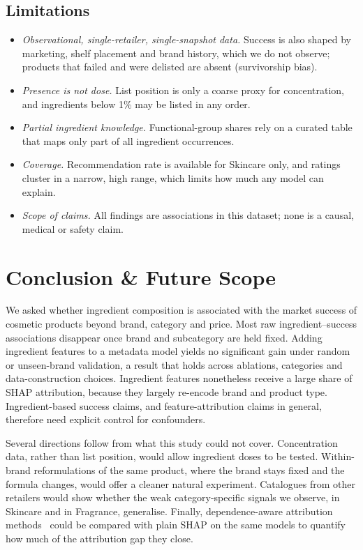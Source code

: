 \documentclass[11pt,a4paper]{article}
\newcommand{\draft}[1]{{\color{blue!70!black}#1}}
\begin{document}
\subsection{Limitations}
\draft{\begin{itemize}
\item \emph{Observational, single-retailer, single-snapshot data.} Success is also shaped by marketing, shelf placement and brand history, which we do not observe; products that failed and were delisted are absent (survivorship bias).
\item \emph{Presence is not dose.} List position is only a coarse proxy for concentration, and ingredients below 1\% may be listed in any order.
\item \emph{Partial ingredient knowledge.} Functional-group shares rely on a curated table that maps only part of all ingredient occurrences.
\item \emph{Coverage.} Recommendation rate is available for Skincare only, and ratings cluster in a narrow, high range, which limits how much any model can explain.
\item \emph{Scope of claims.} All findings are associations in this dataset; none is a causal, medical or safety claim.
\end{itemize}}

\section{Conclusion \& Future Scope}
\draft{We asked whether ingredient composition is associated with the market success of cosmetic products beyond brand, category and price. Most raw ingredient--success associations disappear once brand and subcategory are held fixed. Adding \NIngredientFeatures{} ingredient features to a metadata model yields no significant gain under random or unseen-brand validation, a result that holds across ablations, categories and data-construction choices. Ingredient features nonetheless receive a large share of SHAP attribution, because they largely re-encode brand and product type. Ingredient-based success claims, and feature-attribution claims in general, therefore need explicit control for confounders.

Several directions follow from what this study could not cover. Concentration data, rather than list position, would allow ingredient doses to be tested. Within-brand reformulations of the same product, where the brand stays fixed and the formula changes, would offer a cleaner natural experiment. Catalogues from other retailers would show whether the weak category-specific signals we observe, in Skincare and in Fragrance, generalise. Finally, dependence-aware attribution methods~\cite{aas2021} could be compared with plain SHAP on the same models to quantify how much of the attribution gap they close.}
\end{document}
